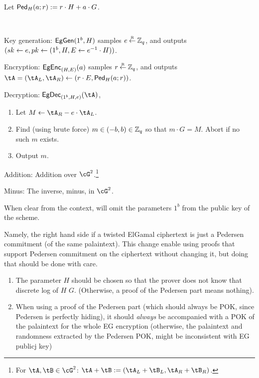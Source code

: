 \begin{notation}
Let $\mathsf{Ped}_H(a;r) := r\cdot H + a \cdot G$.
\end{notation}

\begin{algorithm}\label{alg:tEGinExp}~
	
	
	\item[Key generation:] $\mathsf{EgGen}(1^b,H)$ samples $e\mathbin{\stackrel{\mbox{\tiny R}}{\leftarrow}} {\mathbb Z}_q$, and outputs $({sk} 
	\leftarrow e,{pk} \leftarrow (1^b,H,E\leftarrow  e^{-1}\cdot H))$.
	
	\item[Encryption:] $\mathsf{EgEnc}_{(H,E)}(a)$  samples $r\mathbin{\stackrel{\mbox{\tiny R}}{\leftarrow}} {\mathbb Z}_q$, and outputs  $\tA  = (\tA _L,\tA _R)\asn (r\cdot E, \Ped_H(a;r))$. 
	\item[Decryption:] $\EgDec_{(1^b,H,e)}(\tA)$,   
	\begin{enumerate}
		\item 	Let $M \asn \tA_R - e\cdot \tA_L$.
		
		\item Find (using brute force) $m\in (-b, b) \in {\mathbb Z}_q$ so that $m\cdot G = M$. Abort if no such $m$ exists.
		
		\item Output $m$.
	\end{enumerate}
	
	\item[Addition:] Addition over  $\cG^2$.\footnote{For $\tA,\tB \in \cG^2$: $\tA +\tB \eqdef (\tA_L+\tB_L,\tA_R+\tB_R)$.}
	
	\item[Minus:]  The inverse, \ie minus, in $\cG^2$.
	
\end{algorithm}	
When clear from the context,  will omit the parameters $1^b$ from the public key of the scheme.

Namely, the right hand side if a twisted ElGamal ciphertext is just a  Pedersen  commitment \cite{Pedersen91} (of the same palaintext). This change enable  using proofs that  support  Pedersen commitment on the ciphertext without changing it, but doing that  should be done with care.
\begin{enumerate}
	\item The parameter $H$ should be chosen so that the prover does not know that discrete log of $H$ \wrt $G$. (Otherwise, a proof of the Pedersen part means nothing).
	
	\item When using a proof of  the Pedersen part (which should always be POK, since Pedersen is perfectly hiding), it should \emph{always} be accompanied with a POK of the palaintext for the whole EG encryption (otherwise, the palaintext and randomness  extracted by the  Pedersen POK, might be  inconsistent with  EG publicj key)  
\end{enumerate}

